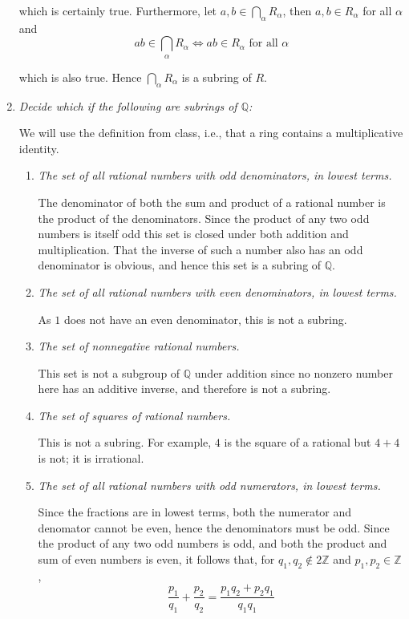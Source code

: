\documentclass[letterpaper, 11pt]{article}
\newcommand{\Z}{\mathbb{Z}}
\newcommand{\Q}{\mathbb{Q}}
\begin{document}
\begin{enumerate}
which is certainly true.  Furthermore, let $a,b \in \bigcap_\alpha R_\alpha$, then $a,b \in R_\alpha$ for all $\alpha$ and
\[
ab \in \bigcap_\alpha R_\alpha \Leftrightarrow ab \in R_\alpha \mbox{ for all $\alpha$}
\]

which is also true.  Hence $\bigcap_\alpha R_\alpha$ is a subring of $R$.

\item \emph{Decide which if the following are subrings of $\Q$:}

We will use the definition from class, i.e., that a ring contains a multiplicative identity.
\begin{enumerate}
\item \emph{The set of all rational numbers with odd denominators, in lowest terms.}

The denominator of both the sum and product of a rational number is the product of the denominators.  Since the product of any two odd numbers is itself odd this set is closed under both addition and multiplication.  That the inverse of such a number also has an odd denominator is obvious, and hence this set is a subring of $\Q$.

\item \emph{The set of all rational numbers with even denominators, in lowest terms.}

As $1$ does not have an even denominator, this is not a subring.
\item \emph{The set of nonnegative rational numbers.}

This set is not a subgroup of $\Q$ under addition since no nonzero number here has an additive inverse, and therefore is not a subring.

\item \emph{The set of squares of rational numbers.}

This is not a subring.  For example, $4$ is the square of a rational but $4 + 4$ is not; it is irrational.

\item \emph{The set of all rational numbers with odd numerators, in lowest terms.}

Since the fractions are in lowest terms, both the numerator and denomator cannot be even, hence the denominators must be odd.  Since the product of any two odd numbers is odd, and both the product and sum of even numbers is even, it follows that, for $q_1,q_2 \notin 2\Z$ and $p_1, p_2 \in \Z$,
\[
\frac{p_1}{q_1} + \frac{p_2}{q_2} = \frac{p_1q_2 + p_2q_1}{q_1q_1}
\]


\end{enumerate}
\end{enumerate}
\end{document}
